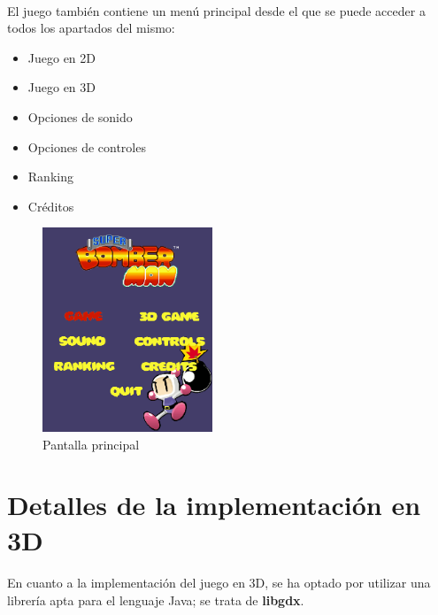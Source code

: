 \documentclass[a4paper]{article}
\begin{document}
\paragraph{}El juego también contiene un menú principal desde el que se puede acceder a todos los apartados del mismo: 
\begin{itemize}
	\item Juego en 2D
	\item Juego en 3D
	\item Opciones de sonido
	\item Opciones de controles
	\item Ranking
	\item Créditos
\end{itemize}
\begin{figure}[H]
	\centering
	\includegraphics[width=2in]{menuses.png}
	\caption{Pantalla principal}
	\label{fig:menuses}
\end{figure}
\newpage
\section{Detalles de la implementación en 3D}
\paragraph{}En cuanto a la implementación del juego en 3D, se ha optado por utilizar una librería apta para el lenguaje Java; se trata de \textbf{libgdx}.
\end{document}
